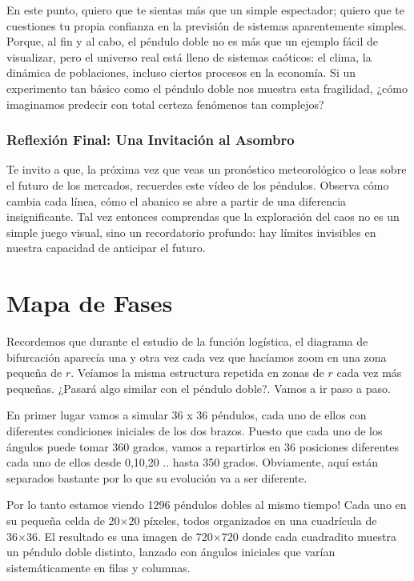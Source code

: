 \documentclass[
  11pt,
  a4paper,
  DIV=11,
  numbers=noendperiod]{scrreprt}
\begin{document}
En este punto, quiero que te sientas más que un simple espectador;
quiero que te cuestiones tu propia confianza en la previsión de sistemas
aparentemente simples. Porque, al fin y al cabo, el péndulo doble no es
más que un ejemplo fácil de visualizar, pero el universo real está lleno
de sistemas caóticos: el clima, la dinámica de poblaciones, incluso
ciertos procesos en la economía. Si un experimento tan básico como el
péndulo doble nos muestra esta fragilidad, ¿cómo imaginamos predecir con
total certeza fenómenos tan complejos?

\subsection{Reflexión Final: Una Invitación al
Asombro}\label{reflexiuxf3n-final-una-invitaciuxf3n-al-asombro}

Te invito a que, la próxima vez que veas un pronóstico meteorológico o
leas sobre el futuro de los mercados, recuerdes este vídeo de los
péndulos. Observa cómo cambia cada línea, cómo el abanico se abre a
partir de una diferencia insignificante. Tal vez entonces comprendas que
la exploración del caos no es un simple juego visual, sino un
recordatorio profundo: hay límites invisibles en nuestra capacidad de
anticipar el futuro.

\chapter{Mapa de Fases}\label{mapa-de-fases}

Recordemos que durante el estudio de la función logística, el diagrama
de bifurcación aparecía una y otra vez cada vez que hacíamos zoom en una
zona pequeña de \(r\). Veíamos la misma estructura repetida en zonas de
\(r\) cada vez más pequeñas. ¿Pasará algo similar con el péndulo doble?.
Vamos a ir paso a paso.

En primer lugar vamos a simular 36 x 36 péndulos, cada uno de ellos con
diferentes condiciones iniciales de los dos brazos. Puesto que cada uno
de los ángulos puede tomar 360 grados, vamos a repartirlos en 36
posiciones diferentes cada uno de ellos desde 0,10,20 .. hasta 350
grados. Obviamente, aquí están separados bastante por lo que su
evolución va a ser diferente.

Por lo tanto estamos viendo 1296 péndulos dobles al mismo tiempo! Cada
uno en su pequeña celda de 20×20 píxeles, todos organizados en una
cuadrícula de 36×36. El resultado es una imagen de 720×720 donde cada
cuadradito muestra un péndulo doble distinto, lanzado con ángulos
iniciales que varían sistemáticamente en filas y columnas.
\end{document}
